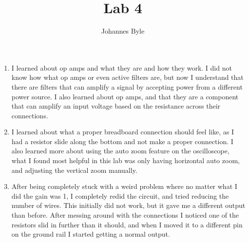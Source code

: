 \documentclass[12pt]{article}
\author{Johannes Byle}
\begin{document}

    \title{Lab 4}
    \maketitle
    \begin{enumerate}
        \item I learned about op amps and what they are and how they work.
        I did not know how what op amps or even active filters are, but now I understand that there are filters that
        can amplify a signal by accepting power from a different power source.
        I also learned about op amps, and that they are a component that can amplify an input voltage based on the
        resistance across their connections.
        \item I learned about what a proper breadboard connection should feel like, as I had a resistor slide along
        the bottom and not make a proper connection.
        I also learned more about using the auto zoom feature on the oscilloscope, what I found most helpful in this
        lab was only having horizontal auto zoom, and adjusting the vertical zoom manually.
        \item After being completely stuck with a weird problem where no matter what I did the gain was 1, I
        completely redid the circuit, and tried reducing the number of wires.
        This initially did not work, but it gave me a different output than before.
        After messing around with the connections I noticed one of the resistors slid in further than it should, and
        when I moved it to a different pin on the ground rail I started getting a normal output.
    \end{enumerate}
\end{document}
